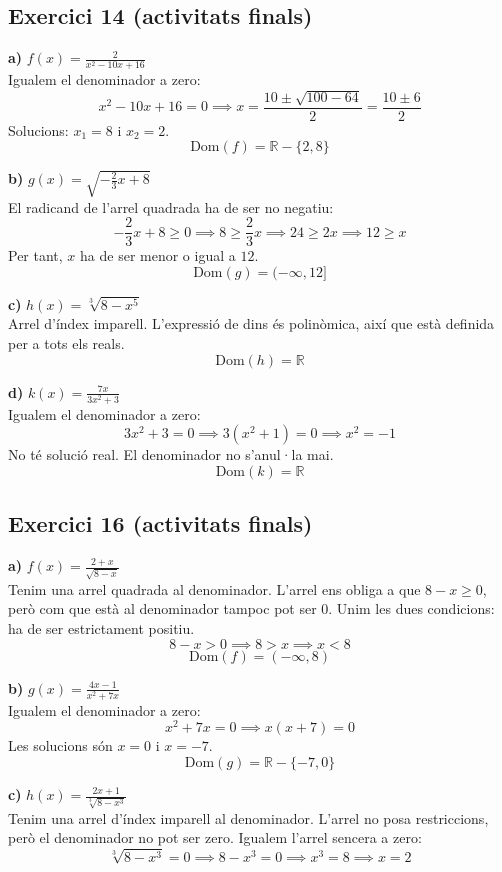 \documentclass[12pt,a4paper]{article}
\begin{document}
\vspace{0.5cm}

\subsection{Exercici 14 (activitats finals)}

\textbf{a)} $f(x) = \frac{2}{x^2-10x+16}$ \\
Igualem el denominador a zero:
\[ x^2-10x+16 = 0 \implies x = \frac{10 \pm \sqrt{100 - 64}}{2} = \frac{10 \pm 6}{2} \]
Solucions: $x_1 = 8$ i $x_2 = 2$.
\[ \text{Dom}(f) = \mathbb{R} - \{2, 8\} \]

\textbf{b)} $g(x) = \sqrt{-\frac{2}{3}x + 8}$ \\
El radicand de l'arrel quadrada ha de ser no negatiu:
\[ -\frac{2}{3}x + 8 \ge 0 \implies 8 \ge \frac{2}{3}x \implies 24 \ge 2x \implies 12 \ge x \]
Per tant, $x$ ha de ser menor o igual a $12$.
\[ \text{Dom}(g) = (-\infty, 12] \]

\textbf{c)} $h(x) = \sqrt[3]{8-x^5}$ \\
Arrel d'índex imparell. L'expressió de dins és polinòmica, així que està definida per a tots els reals.
\[ \text{Dom}(h) = \mathbb{R} \]

\textbf{d)} $k(x) = \frac{7x}{3x^2+3}$ \\
Igualem el denominador a zero:
\[ 3x^2+3 = 0 \implies 3(x^2+1) = 0 \implies x^2 = -1 \]
No té solució real. El denominador no s'anul·la mai.
\[ \text{Dom}(k) = \mathbb{R} \]

\vspace{0.5cm}

\subsection{Exercici 16 (activitats finals)}

\textbf{a)} $f(x) = \frac{2+x}{\sqrt{8-x}}$ \\
Tenim una arrel quadrada al denominador. L'arrel ens obliga a que $8-x \ge 0$, però com que està al denominador tampoc pot ser $0$. Unim les dues condicions: ha de ser estrictament positiu.
\[ 8-x > 0 \implies 8 > x \implies x < 8 \]
\[ \text{Dom}(f) = (-\infty, 8) \]

\textbf{b)} $g(x) = \frac{4x-1}{x^2+7x}$ \\
Igualem el denominador a zero:
\[ x^2+7x = 0 \implies x(x+7) = 0 \]
Les solucions són $x = 0$ i $x = -7$.
\[ \text{Dom}(g) = \mathbb{R} - \{-7, 0\} \]

\textbf{c)} $h(x) = \frac{2x+1}{\sqrt[3]{8-x^3}}$ \\
Tenim una arrel d'índex imparell al denominador. L'arrel no posa restriccions, però el denominador no pot ser zero. Igualem l'arrel sencera a zero:
\[ \sqrt[3]{8-x^3} = 0 \implies 8-x^3 = 0 \implies x^3 = 8 \implies x = 2 \] 
\end{document}
